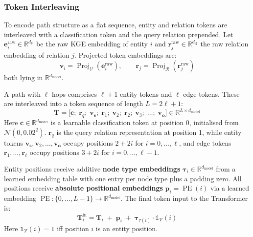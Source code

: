 \vspace{-1em}
\subsubsection{Token Interleaving}
\vspace{-1em}
\label{sec:token-interleaving}

To encode path structure as a flat sequence, entity and relation tokens are interleaved
with a classification token and the query relation prepended.
Let $\mathbf{e}^{\text{raw}}_i \in \mathbb{R}^{d_{\mathcal{V}}}$ be the raw KGE embedding
of entity $i$ and $\mathbf{r}^{\text{raw}}_j \in \mathbb{R}^{d_{\mathcal{R}}}$ the raw
relation embedding of relation $j$.  Projected token embeddings are:
\begin{equation}
\mathbf{v}_i = \operatorname{Proj}_{\mathcal{V}}(\mathbf{e}^{\text{raw}}_i),\qquad
\mathbf{r}_j = \operatorname{Proj}_{\mathcal{R}}(\mathbf{r}^{\text{raw}}_j)
\label{eq:token-proj}
\end{equation}
both lying in $\mathbb{R}^{d_{\text{model}}}$.

A path with $\ell$ hops comprises $\ell+1$ entity tokens and $\ell$ edge tokens.
These are interleaved into a token sequence of length $L = 2\ell + 1$:
\begin{equation}
\mathbf{T} = \bigl[\mathbf{c};\; \mathbf{r}_q;\;
                     \mathbf{v}_{\mathbf{s}};\; \mathbf{r}_{1};\; \mathbf{v}_{2};\; \mathbf{r}_{2};\;
                     \mathbf{v}_{3};\; \ldots;\; \mathbf{v}_{\mathbf{o}}\bigr]
\in \mathbb{R}^{L \times d_{\text{model}}}
\label{eq:token-seq}
\end{equation}
Here $\mathbf{c} \in \mathbb{R}^{d_{\text{model}}}$ is a learnable classification token
at position 0, initialised from $\mathcal{N}(0, 0.02^2)$.  $\mathbf{r}_q$ is the query
relation representation at position 1, while entity tokens $\mathbf{v}_{\mathbf{s}}, \mathbf{v}_{2}, \ldots, \mathbf{v}_{\mathbf{o}}$
occupy positions $2 + 2i$ for $i = 0, \ldots, \ell$, and edge tokens $\mathbf{r}_{1}, \ldots, \mathbf{r}_{\ell}$
occupy positions $3 + 2i$ for $i = 0, \ldots, \ell - 1$.

Entity positions receive additive \textbf{node type embeddings}
$\boldsymbol{\tau}_i \in \mathbb{R}^{d_{\text{model}}}$ from a learned embedding table
with one entry per node type plus a padding zero.
All positions receive \textbf{absolute positional embeddings}
$\mathbf{p}_i = \operatorname{PE}(i)$ via a learned embedding
$\operatorname{PE}: \{0, \ldots, L-1\} \to \mathbb{R}^{d_{\text{model}}}$.
The final token input to the Transformer is:
\begin{equation}
\mathbf{T}^{\text{in}}_i = \mathbf{T}_i \;+\; \mathbf{p}_i \;+\;
    \boldsymbol{\tau}_{\tau(i)} \cdot \mathds{1}_{\mathcal{V}}(i)
\label{eq:token-in}
\end{equation}
Here $\mathds{1}_{\mathcal{V}}(i) = 1$ iff position $i$ is an entity position.


